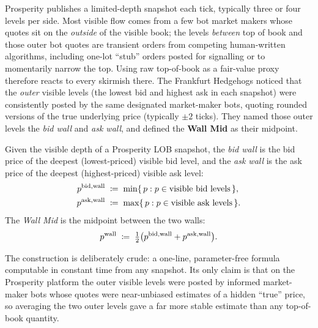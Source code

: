 Prosperity publishes a limited-depth snapshot each tick, typically
three or four levels per side. Most visible flow comes from a few
bot market makers whose quotes sit on the \emph{outside} of the
visible book; the levels \emph{between} top of book and those outer
bot quotes are transient orders from competing human-written
algorithms, including one-lot ``stub'' orders posted for signalling
or to momentarily narrow the top. Using raw top-of-book as a
fair-value proxy therefore reacts to every skirmish there. The
Frankfurt Hedgehogs noticed that the \emph{outer} visible levels
(the lowest bid and highest ask in each snapshot) were
consistently posted by the same designated market-maker bots,
quoting rounded versions of the true underlying price (typically
$\pm 2$ ticks). They named those outer levels the \emph{bid wall}
and \emph{ask wall}, and defined the \textbf{Wall Mid} as their
midpoint.

\begin{definition}
Given the visible depth of a Prosperity LOB snapshot, the \emph{bid
wall} is the bid price of the deepest (lowest-priced) visible bid
level, and the \emph{ask wall} is the ask price of the deepest
(highest-priced) visible ask level:
\begin{align*}
  p^{\mathrm{bid,wall}} &\;\coloneqq\; \min \{\, p : p \in \text{visible bid levels}\, \},\\
  p^{\mathrm{ask,wall}} &\;\coloneqq\; \max \{\, p : p \in \text{visible ask levels}\, \}.
\end{align*}
The \emph{Wall Mid} is the midpoint between the two walls:
\[
  p^{\mathrm{wall}} \;\coloneqq\; \tfrac{1}{2}\bigl(p^{\mathrm{bid,wall}} + p^{\mathrm{ask,wall}}\bigr).
\]
\end{definition}

The construction is deliberately crude: a one-line, parameter-free
formula computable in constant time from any snapshot. Its only
claim is that on the Prosperity platform the outer visible levels
were posted by informed market-maker bots whose quotes were
near-unbiased estimates of a hidden ``true'' price, so averaging the
two outer levels gave a far more stable estimate than any
top-of-book quantity.

